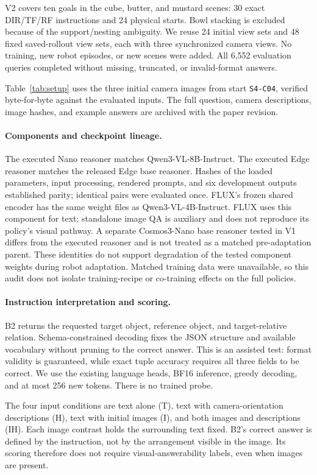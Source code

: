 \documentclass{article}
\begin{document}
V2 covers ten goals in the cube, butter, and mustard scenes: 30 exact DIR/TF/RF instructions and 24 physical starts. Bowl stacking is excluded because of the support/nesting ambiguity. We reuse 24 initial view sets and 48 fixed saved-rollout view sets, each with three synchronized camera views. No training, new robot episodes, or new scenes were added. All 6,552 evaluation queries completed without missing, truncated, or invalid-format answers.

Table~\ref{tab:setup} uses the three initial camera images from start \texttt{S4-C04}, verified byte-for-byte against the evaluated inputs. The full question, camera descriptions, image hashes, and example answers are archived with the paper revision.

\paragraph{Components and checkpoint lineage.}
The executed Nano reasoner matches Qwen3-VL-8B-Instruct. The executed Edge reasoner matches the released Edge base reasoner. Hashes of the loaded parameters, input processing, rendered prompts, and six development outputs established parity; identical pairs were evaluated once. FLUX's frozen shared encoder has the same weight files as Qwen3-VL-4B-Instruct. FLUX uses this component for text; standalone image QA is auxiliary and does not reproduce its policy's visual pathway. A separate Cosmos3-Nano base reasoner tested in V1 differs from the executed reasoner and is not treated as a matched pre-adaptation parent. These identities do not support degradation of the tested component weights during robot adaptation. Matched training data were unavailable, so this audit does not isolate training-recipe or co-training effects on the full policies.

\paragraph{Instruction interpretation and scoring.}
B2 returns the requested target object, reference object, and target-relative relation. Schema-constrained decoding fixes the JSON structure and available vocabulary without pruning to the correct answer. This is an assisted test: format validity is guaranteed, while exact tuple accuracy requires all three fields to be correct. We use the existing language heads, BF16 inference, greedy decoding, and at most 256 new tokens. There is no trained probe.

The four input conditions are text alone (T), text with camera-orientation descriptions (H), text with initial images (I), and both images and descriptions (IH). Each image contrast holds the surrounding text fixed. B2's correct answer is defined by the instruction, not by the arrangement visible in the image. Its scoring therefore does not require visual-answerability labels, even when images are present.
\end{document}
